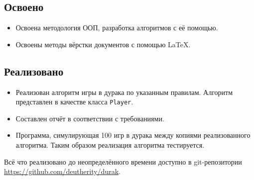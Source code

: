 \documentclass[a4paper,12pt]{article}
\begin{document}
		\subsection{Освоено} 
			\begin{itemize}
				\item 	Освоена методология ООП, разработка алгоритмов с её помощью.
				\item 	Освоены методы вёрстки документов с помощью \LaTeX.
			\end{itemize}
		\subsection{Реализовано}
			\begin{itemize}
				\item 	Реализован алгоритм игры в дурака по указанным правилам.
						Алгоритм представлен в качестве класса \texttt{Player}.
				\item 	Составлен отчёт в соответствии с требованиями.
				\item 	Программа, симулирующая 100 игр в дурака между копиями реализованного алгоритма.
						Таким образом реализация алгоритма тестируется.
			\end{itemize}
		Всё что реализовано до неопределённого времени доступно в git-репозитории\\
		\href{https://github.com/deutherity/durak}{https://github.com/deutherity/durak}.

    \newpage
\end{document}
